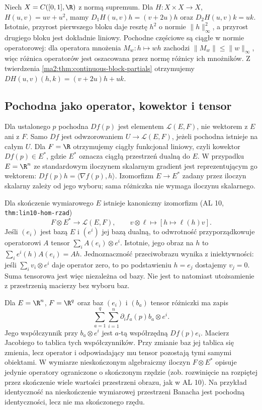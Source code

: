 \begin{przyklad}
Niech $X=C([0,1],\R)$ z normą supremum.
Dla $H:X\times X\to X$, $H(u,v)=uv+u^2$,
mamy $D_1H(u,v)h=(v+2u)h$ oraz
$D_2H(u,v)k=uk$. Istotnie, przyrost pierwszego
bloku daje resztę $h^2$ o normie $\|h\|_\infty^2$,
a przyrost drugiego bloku jest dokładnie liniowy.
Pochodne częściowe są ciągłe w normie operatorowej:
dla operatora mnożenia $M_w:h\mapsto wh$ zachodzi
$\|M_w\|\le\|w\|_\infty$, więc różnica operatorów
jest oszacowana przez normę różnicy ich mnożników.
Z twierdzenia \ref{ma2:thm:continuous-block-partials}
otrzymujemy $DH(u,v)(h,k)=(v+2u)h+uk$.
\end{przyklad}

\subsection{Pochodna jako operator, kowektor i tensor}

\label{ma2:sec:derivative-object}
Dla ustalonego $p$ pochodna $Df(p)$ jest elementem
$\mathcal L(E,F)$, nie wektorem z $E$ ani z $F$.
Samo $Df$ jest odwzorowaniem $U\to\mathcal L(E,F)$,
jeżeli pochodna istnieje na całym $U$.
Dla $F=\R$ otrzymujemy ciągły funkcjonał liniowy,
czyli kowektor $Df(p)\in E^*$, gdzie $E^*$
oznacza ciągłą przestrzeń dualną do $E$.
W przypadku $E=\R^n$ ze standardowym iloczynem
skalarnym gradient jest reprezentującym go
wektorem: $Df(p)h=\langle\nabla f(p),h\rangle$.
Izomorfizm $E\to E^*$ zadany przez iloczyn
skalarny zależy od jego wyboru; sama różniczka
nie wymaga iloczynu skalarnego.

Dla skończenie wymiarowego $E$ istnieje kanoniczny
izomorfizm (AL 10, \texttt{thm:lin10-hom-rzad})
\[
 F\otimes E^*\longrightarrow\mathcal L(E,F),
 \qquad v\otimes\ell\longmapsto[h\mapsto\ell(h)v].
\]
Jeśli $(e_i)$ jest bazą $E$ i $(e^i)$ jej bazą
dualną, to odwrotność przyporządkowuje operatorowi
$A$ tensor $\sum_i A(e_i)\otimes e^i$.
Istotnie, jego obraz na $h$ to
$\sum_i e^i(h)A(e_i)=Ah$.
Jednoznaczność przeciwobrazu wynika z iniektywności:
jeśli $\sum_i v_i\otimes e^i$ daje operator zero,
to po podstawieniu $h=e_j$ dostajemy $v_j=0$.
Suma tensorowa jest więc niezależna od bazy.
Nie jest to natomiast utożsamienie z przestrzenią
macierzy bez wyboru baz.

Dla $E=\R^n$, $F=\R^q$ oraz baz $(e_i)$ i $(b_a)$
tensor różniczki ma zapis
\[
 \sum_{a=1}^q\sum_{i=1}^n
       \partial_i f_a(p)b_a\otimes e^i.
\]
Jego współczynnik przy $b_a\otimes e^i$ jest
$a$-tą współrzędną $Df(p)e_i$.
Macierz Jacobiego to tablica tych współczynników.
Przy zmianie baz jej tablica się zmienia,
lecz operator i odpowiadający mu tensor pozostają
tymi samymi obiektami. W wymiarze nieskończonym
algebraiczny iloczyn $F\otimes E^*$ opisuje
jedynie operatory ograniczone o skończonym rzędzie
(zob. rozwinięcie na rozpiętej przez skończenie
wiele wartości przestrzeni obrazu, jak w AL 10).
Na przykład identyczność na nieskończenie
wymiarowej przestrzeni Banacha jest pochodną
identyczności, lecz nie ma skończonego rzędu.

